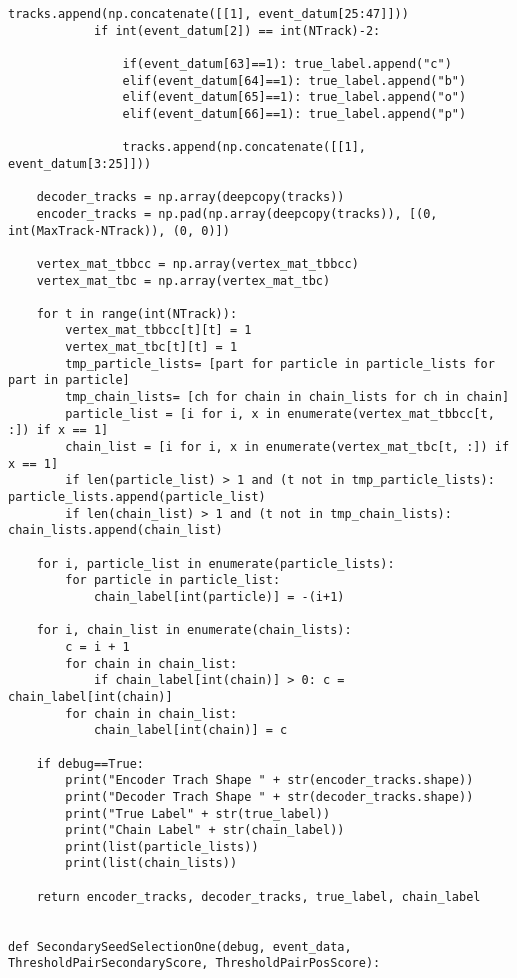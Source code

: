 \begin{lstlisting}[caption=崩壊点検出アルゴリズム用関数,label=VertexFinder1]
            tracks.append(np.concatenate([[1], event_datum[25:47]]))
            if int(event_datum[2]) == int(NTrack)-2:
             
                if(event_datum[63]==1): true_label.append("c")
                elif(event_datum[64]==1): true_label.append("b")
                elif(event_datum[65]==1): true_label.append("o")
                elif(event_datum[66]==1): true_label.append("p")
            
                tracks.append(np.concatenate([[1], event_datum[3:25]]))

    decoder_tracks = np.array(deepcopy(tracks))
    encoder_tracks = np.pad(np.array(deepcopy(tracks)), [(0, int(MaxTrack-NTrack)), (0, 0)])

    vertex_mat_tbbcc = np.array(vertex_mat_tbbcc)
    vertex_mat_tbc = np.array(vertex_mat_tbc)

    for t in range(int(NTrack)):
        vertex_mat_tbbcc[t][t] = 1
        vertex_mat_tbc[t][t] = 1
        tmp_particle_lists= [part for particle in particle_lists for part in particle]
        tmp_chain_lists= [ch for chain in chain_lists for ch in chain]
        particle_list = [i for i, x in enumerate(vertex_mat_tbbcc[t, :]) if x == 1]
        chain_list = [i for i, x in enumerate(vertex_mat_tbc[t, :]) if x == 1]
        if len(particle_list) > 1 and (t not in tmp_particle_lists): particle_lists.append(particle_list)
        if len(chain_list) > 1 and (t not in tmp_chain_lists): chain_lists.append(chain_list)

    for i, particle_list in enumerate(particle_lists):
        for particle in particle_list:
            chain_label[int(particle)] = -(i+1)
    
    for i, chain_list in enumerate(chain_lists):
        c = i + 1
        for chain in chain_list:
            if chain_label[int(chain)] > 0: c = chain_label[int(chain)]
        for chain in chain_list:
            chain_label[int(chain)] = c

    if debug==True: 
        print("Encoder Trach Shape " + str(encoder_tracks.shape))
        print("Decoder Trach Shape " + str(decoder_tracks.shape))
        print("True Label" + str(true_label))
        print("Chain Label" + str(chain_label))
        print(list(particle_lists))
        print(list(chain_lists))

    return encoder_tracks, decoder_tracks, true_label, chain_label


def SecondarySeedSelectionOne(debug, event_data, ThresholdPairSecondaryScore, ThresholdPairPosScore):


\end{lstlisting}
